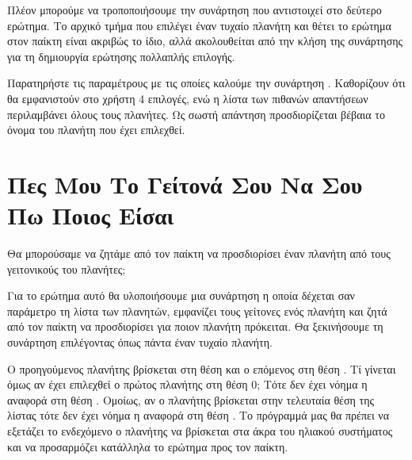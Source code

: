 \documentclass[a4paper,11pt,oneside]{book}
\begin{document}
Πλέον μπορούμε να τροποποιήσουμε την συνάρτηση που αντιστοιχεί στο δεύτερο ερώτημα. Το αρχικό τμήμα που επιλέγει έναν τυχαίο πλανήτη και θέτει το ερώτημα στον παίκτη είναι ακριβώς το ίδιο, αλλά ακολουθείται από την κλήση της συνάρτησης για τη δημιουργία ερώτησης πολλαπλής επιλογής.


Παρατηρήστε τις παραμέτρους με τις οποίες καλούμε την συνάρτηση . Καθορίζουν ότι θα εμφανιστούν στο χρήστη 4 επιλογές, ενώ η λίστα των πιθανών απαντήσεων περιλαμβάνει όλους τους πλανήτες. Ως σωστή απάντηση προσδιορίζεται βέβαια το όνομα του πλανήτη που έχει επιλεχθεί.


\section{Πες Μου Το Γείτονά Σου Να Σου Πω Ποιος Είσαι}

\begin{question}
Θα μπορούσαμε να ζητάμε από τον παίκτη να προσδιορίσει έναν πλανήτη από τους γειτονικούς του πλανήτες; 
\end{question}

Για το ερώτημα αυτό θα υλοποιήσουμε μια συνάρτηση η οποία δέχεται σαν παράμετρο τη λίστα των πλανητών, εμφανίζει τους γείτονες ενός πλανήτη και ζητά από τον παίκτη να προσδιορίσει για ποιον πλανήτη πρόκειται. Θα ξεκινήσουμε τη συνάρτηση επιλέγοντας όπως πάντα έναν τυχαίο πλανήτη.


Ο προηγούμενος πλανήτης βρίσκεται στη θέση  και ο επόμενος στη θέση . Τί γίνεται όμως αν έχει επιλεχθεί ο πρώτος πλανήτης στη θέση 0; Τότε δεν έχει νόημα η αναφορά στη θέση . Ομοίως, αν ο πλανήτης βρίσκεται στην τελευταία θέση της λίστας τότε δεν έχει νόημα η αναφορά στη θέση . Το πρόγραμμά μας θα πρέπει να εξετάζει το ενδεχόμενο ο πλανήτης να βρίσκεται στα άκρα του ηλιακού συστήματος και να προσαρμόζει κατάλληλα το ερώτημα προς τον παίκτη.

\end{document}
